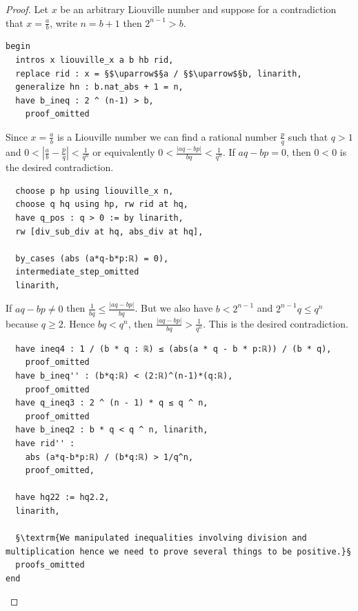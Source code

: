 \documentclass{report}
\theoremstyle{definition}
\begin{document}
\begin{proof}
Let $x$ be an arbitrary Liouville number and suppose for a contradiction that $x=\frac ab$, write $n=b+1$ then $2^{n-1}>b$.
\begin{verbatim}
begin
  intros x liouville_x a b hb rid, 
  replace rid : x = §$\uparrow$§a / §$\uparrow$§b, linarith,
  generalize hn : b.nat_abs + 1 = n,
  have b_ineq : 2 ^ (n-1) > b,
    proof_omitted
\end{verbatim}

Since $x=\frac ab$ is a Liouville number we can find a rational number $\frac pq$ such that $q>1$ and $0<\left|\frac ab-\frac pq\right|<\frac1{q^n}$ or equivalently $0<\frac{\left|aq-bp\right|}{bq}<\frac1{q^n}$. If $aq-bp=0$, then $0<0$ is the desired contradiction.

\begin{verbatim} 
  choose p hp using liouville_x n,
  choose q hq using hp, rw rid at hq,
  have q_pos : q > 0 := by linarith, 
  rw [div_sub_div at hq, abs_div at hq],

  by_cases (abs (a*q-b*p:ℝ) = 0),
  intermediate_step_omitted
  linarith,
\end{verbatim}

If $aq-bp\ne 0$ then $\frac 1{bq}\le\frac{\left|aq-bp\right|}{bq}$. But we also have $b<2^{n-1}$ and $2^{n-1}q\le q^n$ because $q\ge 2$. Hence $bq<q^n$, then $\frac{\left|aq-bp\right|}{bq}>\frac1{q^n}$. This is the desired contradiction.

\begin{verbatim} 
  have ineq4 : 1 / (b * q : ℝ) ≤ (abs(a * q - b * p:ℝ)) / (b * q),
    proof_omitted
  have b_ineq'' : (b*q:ℝ) < (2:ℝ)^(n-1)*(q:ℝ), 
    proof_omitted
  have q_ineq3 : 2 ^ (n - 1) * q ≤ q ^ n,
    proof_omitted
  have b_ineq2 : b * q < q ^ n, linarith,
  have rid'' : 
    abs (a*q-b*p:ℝ) / (b*q:ℝ) > 1/q^n,
    proof_omitted,
  
  have hq22 := hq2.2,
  linarith,

  §\textrm{We manipulated inequalities involving division and multiplication hence we need to prove several things to be positive.}§
  proofs_omitted
end
\end{verbatim}
\end{proof}
\end{document}
